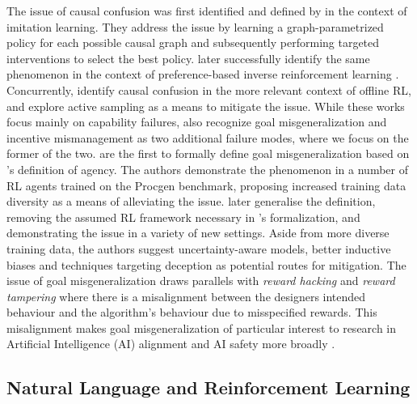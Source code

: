 \documentclass[../thesis-proposal/main.tex]{subfiles}
\begin{document}
The issue of causal confusion was first identified and defined by \citet{de_haan_causal_2019} in the
context of imitation learning. They address the issue by learning a graph-parametrized policy for
each possible causal graph and subsequently performing targeted interventions to select the best
policy.  later successfully identify the same phenomenon in the context of
preference-based \citep{christiano_deep_2017} inverse reinforcement learning
\citep{ng_algorithms_2000}. Concurrently, \citet{gupta_can_2022} identify causal confusion in the
more relevant context of offline RL, and explore active sampling as a means to mitigate the issue.
While these works focus mainly on capability failures, \citet{kirk_causal_2022} also recognize goal
misgeneralization and incentive mismanagement \citep{farquhar_path-specific_2022} as two additional
failure modes, where we focus on the former of the two.  are the first to
formally define goal misgeneralization based on \citet{orseau_agents_2018}'s definition of agency.
The authors demonstrate the phenomenon in a number of RL agents trained on the Procgen
\citep{cobbe_leveraging_2020} benchmark, proposing increased training data diversity as a means of
alleviating the issue.  later generalise the definition, removing the assumed
RL framework necessary in \citet{langosco_goal_2022}'s formalization, and demonstrating the issue in
a variety of new settings. Aside from more diverse training data, the authors suggest
uncertainty-aware models, better inductive biases and techniques targeting deception as potential
routes for mitigation. The issue of goal misgeneralization draws parallels with \textit{reward
hacking} \citep{pan_effects_2022, skalse_defining_2022} and \textit{reward tampering}
\citep{everitt_reward_2021} where there is a misalignment between the designers intended behaviour
and the algorithm's behaviour due to misspecified rewards. This misalignment makes goal
misgeneralization of particular interest to research in Artificial Intelligence (AI) alignment
\citep{ngo_alignment_2022} and AI safety more broadly \citep{hendrycks_unsolved_2022,
houben_inspect_2022}.

\subsection{Natural Language and Reinforcement Learning} 


\ifSubfilesClassLoaded{%
  
}{}
\end{document}
